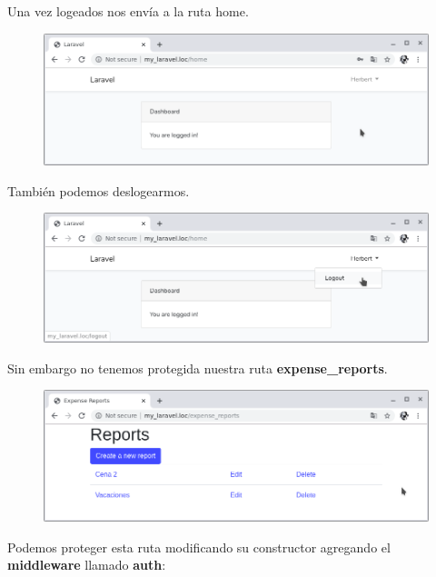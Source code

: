 \documentclass{article}
\begin{document}
Una vez logeados nos envía a la ruta home.

\begin{figure}[h!]
  \centering
  \includegraphics[scale=0.5]{./Pictures/129_home.png}
\end{figure}

También podemos deslogearmos.

\begin{figure}[h!]
  \centering
  \includegraphics[scale=0.5]{./Pictures/130_logout.png}
\end{figure}

Sin embargo no tenemos protegida nuestra ruta \textbf{expense\_reports}.

\newpage

\begin{figure}[h!]
  \centering
  \includegraphics[scale=0.5]{./Pictures/131_exp_reports_not_protected.png}
\end{figure}

Podemos proteger esta ruta modificando su constructor agregando el
\textbf{middleware} llamado \textbf{auth}:\\
\end{document}
